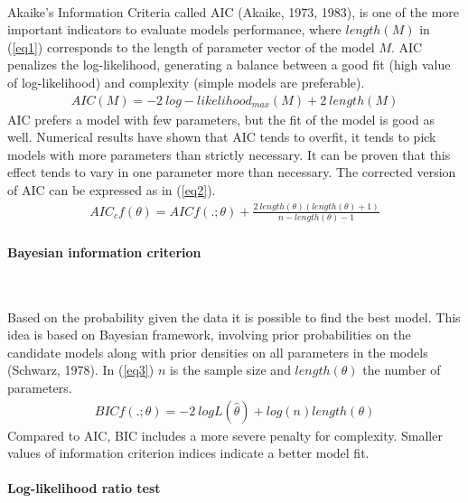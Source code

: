 \documentclass[12pt,a4paper,oneside]{reedthesis}
\begin{document}
~

Akaike's Information Criteria called AIC (Akaike, 1973, 1983), is one of the more important indicators to evaluate models performance, where \(length(M)\) in (\ref{eq1}) corresponds to the length of parameter vector of the model \(M\). AIC penalizes the log-likelihood, generating a balance between a good fit (high value of log-likelihood) and complexity (simple models are preferable).
\begin{align}
AIC(M) = -2 \: log-likelihood_{max}(M) + 2 \:length(M) \label{eq1}
\end{align}
AIC prefers a model with few parameters, but the fit of the model is good as well. Numerical results have shown that AIC tends to overfit, it tends to pick models with more parameters than strictly necessary. It can be proven that this effect tends to vary in one parameter more than necessary. The corrected version of AIC can be expressed as in (\ref{eq2}).
\begin{align}
AIC_c{f(\theta)} = AIC{f(.;\theta)} + \frac{2 \: length(\theta)(length(\theta)+1)}{n-length(\theta) - 1} \label{eq2}
\end{align}
\hypertarget{bayesian-information-criterion}{%
\paragraph{Bayesian information criterion}\label{bayesian-information-criterion}}

~

Based on the probability given the data it is possible to find the best model. This idea is based on Bayesian framework, involving prior probabilities on the candidate models along with prior densities on all parameters in the models (Schwarz, 1978). In (\ref{eq3}) \(n\) is the sample size and \(length(\theta)\) the number of parameters.
\begin{align}
BIC{f(.;\theta)} = -2 \: logL(\hat\theta)+log(n)length(\theta) \label{eq3}
\end{align}
Compared to AIC, BIC includes a more severe penalty for complexity. Smaller values of information criterion indices indicate a better model fit.

\hypertarget{log-likelihood-ratio-test}{%
\paragraph{Log-likelihood ratio test}\label{log-likelihood-ratio-test}}

~
\end{document}
